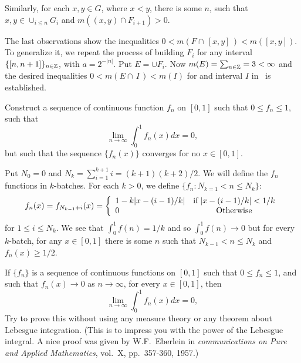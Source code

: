 \begin{enumerate}
Similarly,
for each \(x,y\in G\), where \(x<y\), there is some $n$, such that
\(x,y\in \cup_{i\leq n} G_i\) and \(m((x,y) \cap  F_{i+1}) > 0\).

The last observations show
the inequalities \(0 < m(F\cap\, [x,y]\,) < m([x,y])\).
To generalize it, we repeat the process of building $F_i$ for
any interval \(\{[n,n+1]\}_{n\in\mathbb{Z}}\), with \(a = 2^{-|n|}\).
Put \(E = \cup F_i\). Now \(m(E) = \sum_{n\in\mathbb{Z}} = 3 < \infty\)
and the desired inequalities \(0 < m(E\cap\, I\,) < m(I)\)
for and interval $I$ in \R\ is established.




\begin{excopy}
Construct a sequence of continuous function \(f_n\) on \([0,1]\) such that
\(0\leq f_n \leq 1\), such that
\begin{equation*}
 \lim_{n\rightarrow \infty} \int_0^1 f_n(x)dx = 0,
\end{equation*}
but such that the sequence \(\{f_n(x)\}\) converges for no \(x\in[0,1]\).
\end{excopy}

Put \(N_0 =0\) and \(N_k = \sum_{i=1}^{k+1} i = (k+1)(k+2)/2\).
We will define the \(f_n\) functions in $k$-batches.
For each \(k>0\), we  define \(\{f_n:  N_{k=1} < n \leq N_k\}\):
\begin{equation*}
f_n(x) = f_{N_{k-1}+i}(x) = \left\{
 \begin{array}{l@{\quad}c}
   1 - k|x - (i-1)/k| & \textrm{if}\; |x - (i-1)/k|<1/k \\
   0                  & \textrm{Otherwise}
 \end{array}\right.
\end{equation*}
for \(1\leq i \leq N_k\).
We see that \(\int_0^1 f(n) = 1/k\) and so \(\int_0^1 f(n)\to 0\)
but for every $k$-batch, for any \(x\in[0,1]\)
there is some $n$ such that \(N_{k-1}< n \leq N_k\)
and \(f_n(x) \geq 1/2\).


\begin{excopy} %
If \label{ex:2:10}
\(\{f_n\}\) is a sequence of continuous functions on \([0,1]\) such that
\(0\leq f_n \leq 1\), and such that
\(f_n(x)\to 0\) as \(n \to \infty\),
for every \(x\in[0,1]\), then
\begin{equation*}
 \lim_{n\rightarrow \infty} \int_0^1 f_n(x)dx = 0,
\end{equation*}
Try to prove this without using any measure theory or any theorem
about Lebesgue integration. (This is to impress you with the power of
the Lebesgue integral. A nice proof was given
by W.F.~Eberlein in \emph{communications on Pure and Applied Mathematics},
vol.~X, pp.~357-360, 1957.)
\end{excopy}


\end{enumerate}
